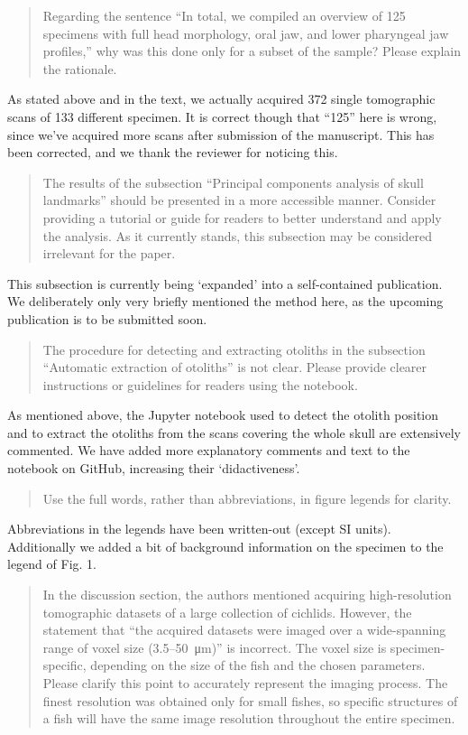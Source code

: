 \documentclass[color,english,personal]{ubletter}
\begin{document}
\begin{letter}{}
\begin{quote}
Regarding the sentence ``In total, we compiled an overview of 125
specimens with full head morphology, oral jaw, and lower pharyngeal jaw
profiles,'' why was this done only for a subset of the sample? Please
explain the rationale.
\end{quote}

As stated above and in the text, we actually acquired 372 single
tomographic scans of 133 different specimen. It is correct though that
``125'' here is wrong, since we've acquired more scans after submission
of the manuscript. This has been corrected, and we thank the reviewer
for noticing this.

\begin{quote}
The results of the subsection ``Principal components analysis of skull
landmarks'' should be presented in a more accessible manner. Consider
providing a tutorial or guide for readers to better understand and apply
the analysis. As it currently stands, this subsection may be considered
irrelevant for the paper.
\end{quote}

This subsection is currently being `expanded' into a self-contained
publication. We deliberately only very briefly mentioned the method
here, as the upcoming publication is to be submitted soon.

\begin{quote}
The procedure for detecting and extracting otoliths in the subsection
``Automatic extraction of otoliths'' is not clear. Please provide
clearer instructions or guidelines for readers using the notebook.
\end{quote}

As mentioned above, the Jupyter notebook used to detect the otolith
position and to extract the otoliths from the scans covering the whole
skull are extensively commented. We have added more explanatory comments
and text to the notebook on GitHub, increasing their `didactiveness'.

\begin{quote}
Use the full words, rather than abbreviations, in figure legends for
clarity.
\end{quote}

Abbreviations in the legends have been written-out (except SI units).
Additionally we added a bit of background information on the specimen to
the legend of Fig. 1.

\begin{quote}
In the discussion section, the authors mentioned acquiring
high-resolution tomographic datasets of a large collection of cichlids.
However, the statement that ``the acquired datasets were imaged over a
wide-spanning range of voxel size (3.5--\SI{50}{\micro\meter})'' is incorrect. The voxel
size is specimen-specific, depending on the size of the fish and the
chosen parameters. Please clarify this point to accurately represent the
imaging process. The finest resolution was obtained only for small
fishes, so specific structures of a fish will have the same image
resolution throughout the entire specimen.
\end{quote}


\end{letter}
\end{document}
